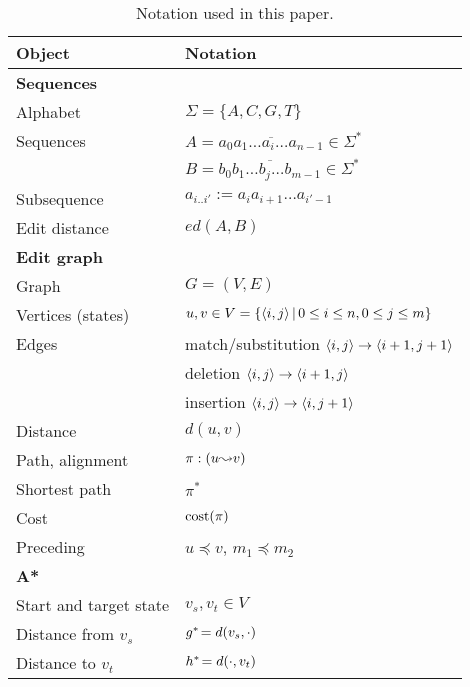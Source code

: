%
%

\newcommand*{\tabindent}{\hspace{3mm}}
\begin{table}[h]
  \centering
  \caption{Notation used in this paper.}
  \begin{tabular}{ll}
	\hline
	\textbf{Object}	         & \textbf{Notation}\\
	\hline
	\textbf{Sequences}  & \\
	\tabindent Alphabet            	& $\Sigma = \{A,C,G,T\}$ \\
	\tabindent Sequences            &
									  $A = \overline{a_0a_1 \dots a_i \dots a_{n-1}}\in \Sigma^*$\\
							 & $B = \overline{b_0b_1 \dots b_j \dots b_{m-1}} \in \Sigma^*$ \\
	\tabindent Subsequence          & $a_{i..i'} := a_ia_{i+1}\dots a_{i'-1}$\\
	\tabindent Edit distance        & $ed(A,B)$\\
	\hline
	\textbf{Edit graph} & \\
	\tabindent Graph& $G=(V,E)$\\
	\tabindent Vertices (states) & $u,v \in V=\{\langle i, j \rangle\, |\, 0\leq i\leq n, 0\leq j
								   \leq m\}$\\
	\tabindent Edges& match/substitution $\langle i, j \rangle \to \langle i+1, j+1 \rangle$\\
							 & deletion $\langle i, j \rangle \to \langle i+1, j \rangle$\\
							 & insertion $\langle i, j \rangle \to \langle i, j+1 \rangle$\\
	\tabindent Distance & $d(u, v)$\\
	\tabindent Path, alignment & $\pi: (u{\leadsto}v)$\\
	\tabindent Shortest path & $\pi^*$\\
	\tabindent Cost & $\operatorname{cost}(\pi)$\\
	\tabindent Preceding & $u \preceq v$, $m_1\preceq m_2$ \\
	\hline
	\textbf{A*} & \\
	\tabindent Start and target state& $v_s, v_t \in V$\\
	\tabindent Distance from $v_s$ & $g^*\! = d(v_s, \cdot)$\\
	\tabindent Distance to $v_t$& $h^*\! = d(\cdot, v_t)$\\

\end{tabular}
\end{table}
